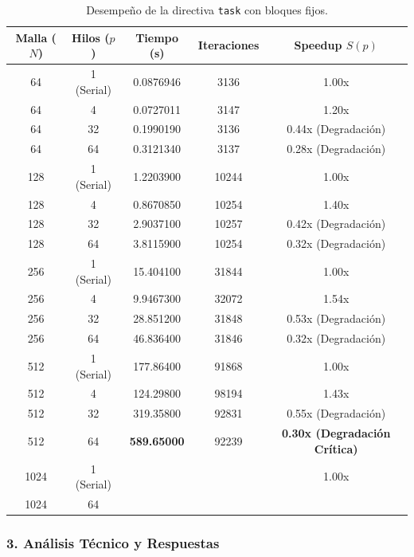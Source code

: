 \documentclass[11pt,a4paper]{article}
\begin{document}
\begin{table}[H]
\centering
\renewcommand{\arraystretch}{1.2}
\small
\begin{tabular}{|c|c|c|c|c|}
\hline
\textbf{Malla ($N$)} & \textbf{Hilos ($p$)} & \textbf{Tiempo (s)} & \textbf{Iteraciones} & \textbf{Speedup $S(p)$} \\ \hline
64 & 1 (Serial) & 0.0876946 & 3136 & 1.00x \\ 
64 & 4 & 0.0727011 & 3147 & 1.20x \\ 
64 & 32 & 0.1990190 & 3136 & 0.44x (Degradación) \\ 
64 & 64 & 0.3121340 & 3137 & 0.28x (Degradación) \\ \hline
128 & 1 (Serial) & 1.2203900 & 10244 & 1.00x \\ 
128 & 4 & 0.8670850 & 10254 & 1.40x \\ 
128 & 32 & 2.9037100 & 10257 & 0.42x (Degradación) \\ 
128 & 64 & 3.8115900 & 10254 & 0.32x (Degradación) \\ \hline
256 & 1 (Serial) & 15.404100 & 31844 & 1.00x \\ 
256 & 4 & 9.9467300 & 32072 & 1.54x \\ 
256 & 32 & 28.851200 & 31848 & 0.53x (Degradación) \\ 
256 & 64 & 46.836400 & 31846 & 0.32x (Degradación) \\ \hline
512 & 1 (Serial) & 177.86400 & 91868 & 1.00x \\ 
512 & 4 & 124.29800 & 98194 & 1.43x \\ 
512 & 32 & 319.35800 & 92831 & 0.55x (Degradación) \\ 
512 & 64 & \textbf{589.65000} & 92239 & \textbf{0.30x (Degradación Crítica)} \\ \hline
1024 & 1 (Serial) & & & 1.00x \\ 
1024 & 64 & & & \\ \hline
\end{tabular}
\caption{Desempeño de la directiva \texttt{task} con bloques fijos.}
\label{tab:resultados_task}
\end{table}

\subsubsection*{3. Análisis Técnico y Respuestas}
\end{document}
